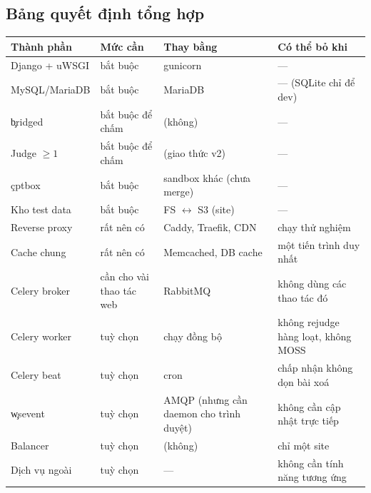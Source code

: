 \subsection{Bảng quyết định tổng hợp}
\begin{center}\small
\begin{tabularx}{\textwidth}{@{}L{3.2cm}L{2.4cm}L{4.6cm}Y@{}}
\toprule
Thành phần & Mức cần & Thay bằng & Có thể bỏ khi \\
\midrule
Django + uWSGI & bắt buộc & gunicorn & --- \\
MySQL/MariaDB & bắt buộc & MariaDB & --- (SQLite chỉ để dev) \\
\c{bridged} & bắt buộc để chấm & (không) & --- \\
Judge $\ge 1$ & bắt buộc để chấm & (giao thức v2) & --- \\
\c{cptbox} & bắt buộc & sandbox khác (chưa merge) & --- \\
Kho test data & bắt buộc & FS $\leftrightarrow$ S3 (site) & --- \\
Reverse proxy & rất nên có & Caddy, Traefik, CDN & chạy thử nghiệm \\
Cache chung & rất nên có & Memcached, DB cache & một tiến trình duy nhất \\
Celery broker & cần cho vài thao tác web & RabbitMQ & không dùng các thao tác đó \\
Celery worker & tuỳ chọn & chạy đồng bộ & không rejudge hàng loạt, không MOSS \\
Celery beat & tuỳ chọn & cron & chấp nhận không dọn bài xoá \\
\c{wsevent} & tuỳ chọn & AMQP (nhưng cần daemon cho trình duyệt) & không cần cập nhật trực tiếp \\
Balancer & tuỳ chọn & (không) & chỉ một site \\
Dịch vụ ngoài & tuỳ chọn & --- & không cần tính năng tương ứng \\
\bottomrule
\end{tabularx}
\end{center}
